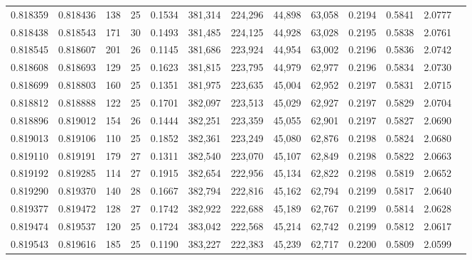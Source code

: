 \begin{tabular}{rrrrrrrrrrrrr}
0.818359 & 0.818436 &   138 &  25 &                                     0.1534 & 381,314 & 224,296 &  44,898 &  63,058 & 0.2194 & 0.5841 & 2.0777 \\
0.818438 & 0.818543 &   171 &  30 &                                     0.1493 & 381,485 & 224,125 &  44,928 &  63,028 & 0.2195 & 0.5838 & 2.0761 \\
0.818545 & 0.818607 &   201 &  26 &                                     0.1145 & 381,686 & 223,924 &  44,954 &  63,002 & 0.2196 & 0.5836 & 2.0742 \\
0.818608 & 0.818693 &   129 &  25 &                                     0.1623 & 381,815 & 223,795 &  44,979 &  62,977 & 0.2196 & 0.5834 & 2.0730 \\
0.818699 & 0.818803 &   160 &  25 &                                     0.1351 & 381,975 & 223,635 &  45,004 &  62,952 & 0.2197 & 0.5831 & 2.0715 \\
0.818812 & 0.818888 &   122 &  25 &                                     0.1701 & 382,097 & 223,513 &  45,029 &  62,927 & 0.2197 & 0.5829 & 2.0704 \\
0.818896 & 0.819012 &   154 &  26 &                                     0.1444 & 382,251 & 223,359 &  45,055 &  62,901 & 0.2197 & 0.5827 & 2.0690 \\
0.819013 & 0.819106 &   110 &  25 &                                     0.1852 & 382,361 & 223,249 &  45,080 &  62,876 & 0.2198 & 0.5824 & 2.0680 \\
0.819110 & 0.819191 &   179 &  27 &                                     0.1311 & 382,540 & 223,070 &  45,107 &  62,849 & 0.2198 & 0.5822 & 2.0663 \\
0.819192 & 0.819285 &   114 &  27 &                                     0.1915 & 382,654 & 222,956 &  45,134 &  62,822 & 0.2198 & 0.5819 & 2.0652 \\
0.819290 & 0.819370 &   140 &  28 &                                     0.1667 & 382,794 & 222,816 &  45,162 &  62,794 & 0.2199 & 0.5817 & 2.0640 \\
0.819377 & 0.819472 &   128 &  27 &                                     0.1742 & 382,922 & 222,688 &  45,189 &  62,767 & 0.2199 & 0.5814 & 2.0628 \\
0.819474 & 0.819537 &   120 &  25 &                                     0.1724 & 383,042 & 222,568 &  45,214 &  62,742 & 0.2199 & 0.5812 & 2.0617 \\
0.819543 & 0.819616 &   185 &  25 &                                     0.1190 & 383,227 & 222,383 &  45,239 &  62,717 & 0.2200 & 0.5809 & 2.0599 \\

\end{tabular}
